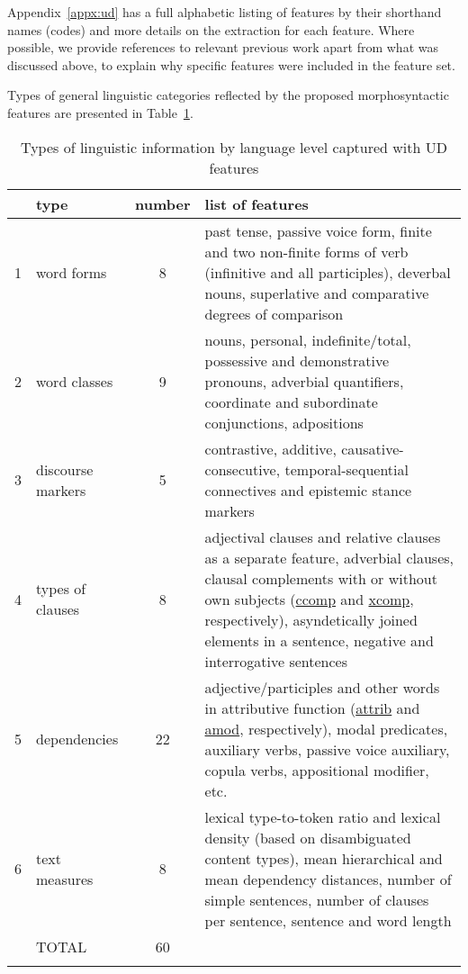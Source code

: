 Appendix~\ref{appx:ud} has a full alphabetic listing of features by their shorthand names (codes) and more details on the extraction for each feature. Where possible, we provide references to relevant previous work apart from what was discussed above, to explain why specific features were included in the feature set. 

Types of general linguistic categories reflected by the proposed morphosyntactic features are presented in Table~\ref{tab:feats}. 

\begin{longtable}[H]{@{} l|l|c|p{10cm} @{}}
	\toprule
		& type & number & list of features \\
		\midrule
		1 & word forms & 8 & past tense, passive voice form, finite and two non-finite forms of verb (infinitive and all participles), deverbal nouns, superlative and comparative degrees of comparison \\
		
		2 & word classes & 9 & nouns, personal, indefinite/total, possessive and demonstrative pronouns, adverbial quantifiers, coordinate and subordinate conjunctions, adpositions \\
		
		3 & discourse markers & 5 & contrastive, additive, causative-consecutive, temporal-sequential connectives and epistemic stance markers \\
		
		4 & types of clauses & 8 & adjectival clauses and relative clauses as a separate feature, adverbial clauses, clausal complements with or without own subjects (\hyperlink{ft:ccomp}{ccomp} and \hyperlink{ft:xcomp}{xcomp}, respectively), asyndetically joined elements in a sentence, negative and interrogative sentences \\
		
		5 & dependencies & 22 & adjective/participles and other words in attributive function (\hyperlink{ft:attrib}{attrib} and \hyperlink{ft:amod}{amod}, respectively), modal predicates, auxiliary verbs, passive voice auxiliary, copula verbs, appositional modifier, etc.\\
		
		6 & text measures & 8 & lexical type-to-token ratio and lexical density (based on disambiguated content types), mean hierarchical and mean dependency distances, number of simple sentences, number of clauses per sentence, sentence and word length \\
		\midrule
		& TOTAL & 60 & \\
		\bottomrule

	\caption{\label{tab:feats} Types of linguistic information by language level captured with UD features}\\
\end{longtable}

